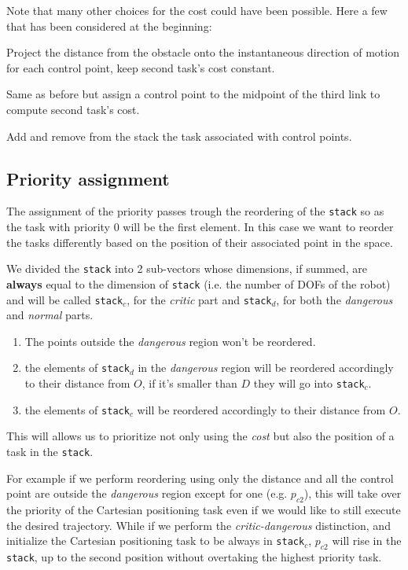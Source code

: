 \documentclass[12pt, a4paper]{article}
\begin{document}
Note that many other choices for the cost could have been possible. Here a few that has been considered at the beginning:
\begin{list}{\textbf{Case:}}{}
\item Project the distance from the obstacle onto the instantaneous direction of motion for each control point, keep second task's cost constant.
\item Same as before but assign a control point to the midpoint of the third link to compute second task's cost.
\item Add and remove from the stack the task associated with control points.
\end{list}
\subsection{Priority assignment}

The assignment of the priority passes trough the reordering of the \texttt{stack} so as the task with priority $0$ will be the first element.
In this case we want to reorder the tasks differently based on the position of their associated point in the space.

We divided the \texttt{stack} into 2 sub-vectors whose dimensions, if summed, are \textbf{always} equal to the dimension of \texttt{stack} (i.e. the number of DOFs of the robot) and will be called \texttt{stack$_c$}, for the \emph{critic} part and \texttt{stack$_d$}, for both the \emph{dangerous} and \emph{normal} parts.

\begin{enumerate}
\item The points outside the \emph{dangerous} region won't be reordered.
\item the elements of \texttt{stack$_d$} in the \emph{dangerous} region will be reordered accordingly to their distance from $O$, if it's smaller than $D$ they will go into \texttt{stack$_c$}.
\item the elements of \texttt{stack$_c$} will be reordered accordingly to their distance from $O$.
\end{enumerate}
This will allows us to prioritize not only using the \emph{cost} but also the position of a task in the \texttt{stack}.

For example if we perform reordering using only the distance and all the control point are outside the \emph{dangerous} region except for one (e.g. $p_{c2}$), this will take over the priority of the Cartesian positioning task even if we would like to still execute the desired trajectory. While if we perform the \emph{critic-dangerous} distinction, and initialize the Cartesian positioning task to be always in \texttt{stack$_c$}, $p_{c2}$ will rise in the \texttt{stack}, up to the second position without overtaking the highest priority task.
\end{document}
